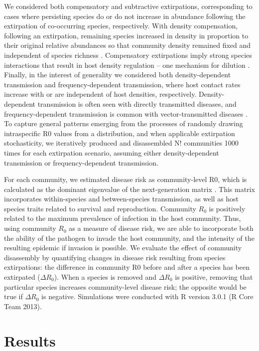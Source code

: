 We considered both compensatory and subtractive extirpations, corresponding to cases where persisting species do or do not increase in abundance following the extirpation of co-occurring species, respectively.
With density compensation, following an extirpation, remaining species increased in density in proportion to their original relative abundances so that community density remained fixed and independent of species richness \citep{MacArthur1972}.
Compensatory extirpations imply strong species interactions that result in host density regulation – one mechanism for dilution \citep{Keesing2006}.
Finally, in the interest of generality we considered both density-dependent transmission and frequency-dependent transmission, where host contact rates increase with or are independent of host densities, respectively.
Density-dependent transmission is often seen with directly transmitted diseases, and frequency-dependent transmission is common with vector-transmitted diseases \citep{McCallum2001}.
To capture general patterns emerging from the processes of randomly drawing intraspecific R0 values from a distribution, and when applicable extirpation stochasticity, we iteratively produced and disassembled N! communities 1000 times for each extirpation scenario, assuming either density-dependent transmission or frequency-dependent transmission.

For each community, we estimated disease risk as community-level R0, which is calculated as the dominant eigenvalue of the next-generation matrix \citep{Dobson2004}.
This matrix incorporates within-species and between-species transmission, as well as host species traits related to survival and reproduction.
Community $R_0$ is positively related to the maximum prevalence of infection in the host community.
Thus, using community $R_0$ as a measure of disease risk, we are able to incorporate both the ability of the pathogen to invade the host community, and the intensity of the resulting epidemic if invasion is possible.
We evaluate the effect of community disassembly by quantifying changes in disease risk resulting from species extirpations: the difference in community R0 before and after a species has been extirpated ($\Delta R_0$).
When a species is removed and $\Delta R_0$ is positive, removing that particular species increases community-level disease risk; the opposite would be true if $\Delta R_0$ is negative.
Simulations were conducted with R version 3.0.1 (R Core Team 2013).

\section{Results}

